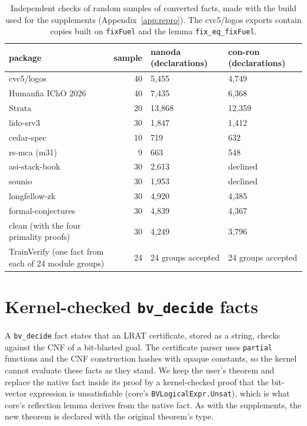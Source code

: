 \documentclass[11pt]{article}
\begin{document}
\begin{table}[t]\centering\small
\begin{tabular}{>{\raggedright\arraybackslash}p{6.3cm}rll}\toprule
package & sample & nanoda (declarations) & con-ron (declarations)\\\midrule
cvc5/logos & 40 & 5,455 & 4,749\\
Humanfia IChO 2026 & 40 & 7,435 & 6,368\\
Strata & 20 & 13,868 & 12,359\\
lido-srv3 & 30 & 1,847 & 1,412\\
cedar-spec & 10 & 719 & 632\\
rs-mca (m31) & 9 & 663 & 548\\
asi-stack-book & 30 & 2,613 & declined\\
sounio & 30 & 1,953 & declined\\
longfellow-zk & 30 & 4,920 & 4,385\\
formal-conjectures & 30 & 4,839 & 4,367\\
clean (with the four primality proofs) & 30 & 4,249 & 3,796\\
TrainVerify (one fact from each of 24 module groups) & 24 & 24 groups accepted & 24 groups accepted\\\bottomrule
\end{tabular}
\caption{Independent checks of random samples of converted facts, made with the build used for the supplements
(Appendix~\ref{app:repro}). The
cvc5/logos exports contain copies built on \texttt{fixFuel} and the lemma
\texttt{fix\_eq\_fixFuel}.}\label{tab:recheck}
\end{table}

\section{Kernel-checked \texttt{bv\_decide} facts}\label{sec:bvd}
A \texttt{bv\_decide} fact states that an LRAT certificate, stored as a string, checks against the
CNF of a bit-blasted goal. The certificate parser uses \texttt{partial} functions and the CNF
construction hashes with opaque constants, so the kernel cannot evaluate these facts as they
stand. We keep the user's theorem and replace the native fact inside its proof by a kernel-checked
proof that the bit-vector expression is unsatisfiable (core's \texttt{BVLogicalExpr.Unsat}), which
is what core's reflection lemma derives from the native fact. As with the supplements, the new theorem is
declared with the original theorem's type.
\end{document}

